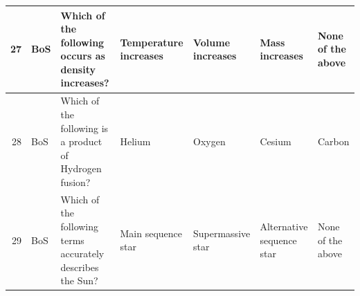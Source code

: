 \documentclass[10pt]{article}
\begin{document}
\begin{tiny}
\begin{longtable}{r|p{0.375in}|p{1.275in}|p{0.75in}|p{0.75in}|p{0.75in}|p{0.75in}}
    27    &     BoS &                                                                                                                                                                                                                              Which of the following occurs as density increases? &                                                                                                                 Temperature increases &                                                                                      Volume increases &                                                                                                             Mass increases &                                                                                                                 None of the above \\\hline
    28    &     BoS &                                                                                                                                                                                                                          Which of the following is a product of Hydrogen fusion? &                                                                                                                                Helium &                                                                                                Oxygen &                                                                                                                     Cesium &                                                                                                                            Carbon \\\hline
    29    &     BoS &                                                                                                                                                                                                                       Which of the following terms accurately describes the Sun? &                                                                                                                    Main sequence star &                                                                                     Supermassive star &                                                                                                  Alternative sequence star &                                                                                                                 None of the above \\\hline

\end{longtable}
\end{tiny}
\end{document}
